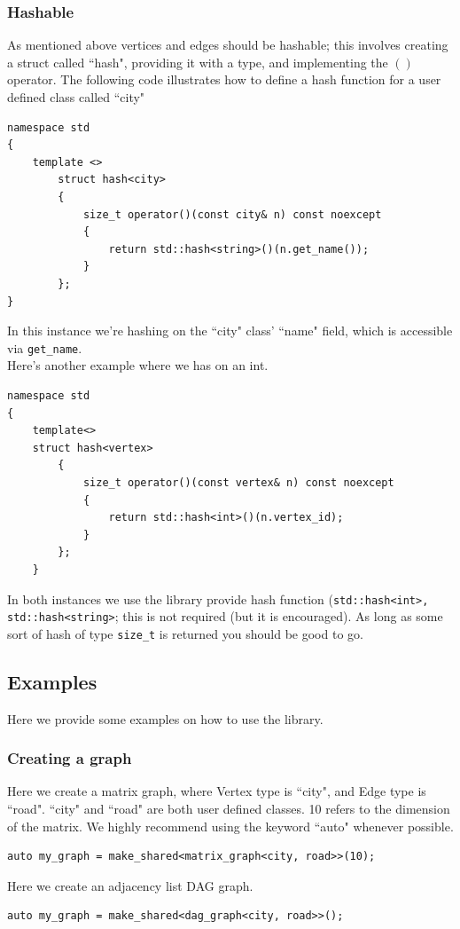 \documentclass{article}
\begin{document}
\subsubsection{Hashable}
As mentioned above vertices and edges should be hashable; this involves creating a struct called ``hash", providing it with a type, and implementing the $()$ operator. The following code illustrates how to define a hash function for a user defined class called ``city"

\begin{lstlisting}
namespace std
{
	template <>
		struct hash<city>
		{
			size_t operator()(const city& n) const noexcept
			{
				return std::hash<string>()(n.get_name());
			}
		};
}
\end{lstlisting}
In this instance we're hashing on the ``city" class' ``name" field, which is accessible via \texttt{get\_name}.
\\
Here's another example where we has on an int.
\begin{lstlisting}
namespace std
{
	template<>
	struct hash<vertex>
		{
			size_t operator()(const vertex& n) const noexcept
			{
				return std::hash<int>()(n.vertex_id);
			}
		};
	}
\end{lstlisting}
In both instances we use the library provide hash function (\texttt{std::hash<int>, std::hash<string>}; this is not required (but it is encouraged). As long as some sort of hash of type \texttt{size\_t} is returned you should be good to go.

\subsection{Examples}
Here we provide some examples on how to use the library. 
\subsubsection{Creating a graph}
Here we create a matrix graph, where Vertex type is ``city", and Edge type is ``road". ``city" and ``road" are both user defined classes. 10 refers to the dimension of the matrix. We highly recommend using the keyword ``auto" whenever possible.
\begin{lstlisting}
auto my_graph = make_shared<matrix_graph<city, road>>(10);
\end{lstlisting}
Here we create an adjacency list DAG graph.
\begin{lstlisting}
auto my_graph = make_shared<dag_graph<city, road>>();
\end{lstlisting}
\end{document}
